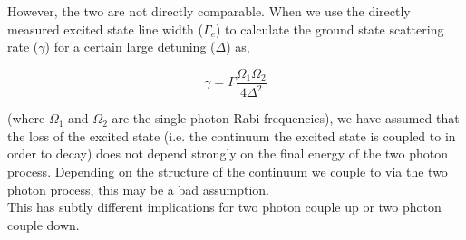 \documentclass[10pt,fleqn]{article}
\begin{document}
However, the two are not directly comparable. When we use the directly measured
excited state line width ($\Gamma_e$) to calculate the ground state scattering rate ($\gamma$)
for a certain large detuning ($\Delta$) as,

\[ \gamma=\Gamma\frac{\Omega_1\Omega_2}{4\Delta^2} \]

(where $\Omega_1$ and $\Omega_2$ are the single photon Rabi frequencies), we have
assumed that the loss of the excited state
(i.e. the continuum the excited state is coupled to in order to decay)
does not depend strongly on the final energy of the two photon process.
Depending on the structure of the continuum we couple to via the two photon process,
this may be a bad assumption.\\

This has subtly different implications for two photon couple up or two photon couple down.
\end{document}
